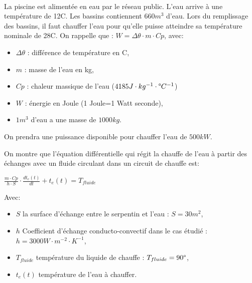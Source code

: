 
~\

La piscine est alimentée en eau par le réseau public. L'eau arrive à une température de 12\textdegree C. Les bassins contiennent $660m^3$ d'eau.
Lors du remplissage des bassins, il faut chauffer l'eau pour qu'elle puisse atteindre sa température nominale de 28\textdegree C.
On rappelle que : $W = \Delta\theta\cdot m\cdot Cp$, avec:
\begin{itemize}
 \item $\Delta\theta$ : différence de température en \textdegree C,
 \item $m$ : masse de l'eau en kg,
 \item $Cp$ : chaleur massique de l'eau ($4185J\cdot kg^{-1}\cdot\degree C^{-1}$)
 \item $W$ : énergie en Joule (1 Joule=1 Watt seconde),
 \item $1m^3$ d'eau a une masse de $1000 kg$.
\end{itemize}


On prendra une puissance disponible pour chauffer l'eau de $500 kW$.


\newpage

On montre que l'équation différentielle qui régit la chauffe de l'eau à partir des échanges avec un fluide circulant dans un circuit de chauffe est:

\begin{center}
$\frac{m\cdot Cp}{h\cdot S}\cdot\frac{dt_e(t)}{dt}+t_e(t)=T_{fluide}$
\end{center}

Avec: 
\begin{itemize}
 \item $S$ la surface d'échange entre le serpentin et l'eau : $S = 30 m^2$,
 \item $h$ Coefficient d'échange conducto-convectif dans le cas étudié : $h=3000W\cdot m^{-2}\cdot K^{-1}$,
 \item $T_{fluide}$ température du liquide de chauffe : $T_{fluide}=90\degree$,
 \item $t_e(t)$ température de l'eau à chauffer.
\end{itemize}

